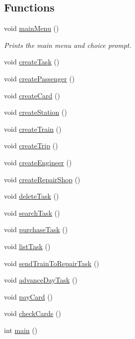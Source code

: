 \subsection*{Functions}
\begin{DoxyCompactItemize}
\item 
void \mbox{\hyperlink{Train-System_8cpp_ab3002fe8e0074c9e2ecb5b835e5e819f}{main\+Menu}} ()
\begin{DoxyCompactList}\small\item\em Prints the main menu and choice prompt. \end{DoxyCompactList}\item 
void \mbox{\hyperlink{Train-System_8cpp_ac6b62651f3428a773cc4b856d382d4ba}{create\+Task}} ()
\item 
void \mbox{\hyperlink{Train-System_8cpp_ab7588618ce8693be3c5cbfdd2e5d9f41}{create\+Passenger}} ()
\item 
void \mbox{\hyperlink{Train-System_8cpp_a046f15f0d2069f268cd2f818cac53ccf}{create\+Card}} ()
\item 
void \mbox{\hyperlink{Train-System_8cpp_a06aa6dbae847b41673895645c4c4585a}{create\+Station}} ()
\item 
void \mbox{\hyperlink{Train-System_8cpp_ac6b94afb09ed41f340489a61f7349d3d}{create\+Train}} ()
\item 
void \mbox{\hyperlink{Train-System_8cpp_ad4041e4e0eaf523f74477b7d0409d493}{create\+Trip}} ()
\item 
void \mbox{\hyperlink{Train-System_8cpp_a5dc3267477bbb266c4465f2a1ac03acd}{create\+Engineer}} ()
\item 
void \mbox{\hyperlink{Train-System_8cpp_ac0c7ddc1730569b15adbd4ebeab84bc1}{create\+Repair\+Shop}} ()
\item 
void \mbox{\hyperlink{Train-System_8cpp_a707ef45664b3d98b60124d73406d1d7e}{delete\+Task}} ()
\item 
void \mbox{\hyperlink{Train-System_8cpp_aa304a31243db94cf775bdf5014252981}{search\+Task}} ()
\item 
void \mbox{\hyperlink{Train-System_8cpp_a94e2f63ee8229943a5825715b3fe6843}{purchase\+Task}} ()
\item 
void \mbox{\hyperlink{Train-System_8cpp_a21054ad0cdbd7095b27ef9ac3396495b}{list\+Task}} ()
\item 
void \mbox{\hyperlink{Train-System_8cpp_ae888f32c12e785a350ad1feb2c6b7f50}{send\+Train\+To\+Repair\+Task}} ()
\item 
void \mbox{\hyperlink{Train-System_8cpp_abddbad3ddf840e58faa0be003dea4bc1}{advance\+Day\+Task}} ()
\item 
void \mbox{\hyperlink{Train-System_8cpp_a0fad85a1b7ab8e584b507f108d2dd6cf}{pay\+Card}} ()
\item 
void \mbox{\hyperlink{Train-System_8cpp_acc3a8510afc936d345b1330b79a4cf13}{check\+Cards}} ()
\item 
int \mbox{\hyperlink{Train-System_8cpp_ae66f6b31b5ad750f1fe042a706a4e3d4}{main}} ()
\end{DoxyCompactItemize}


